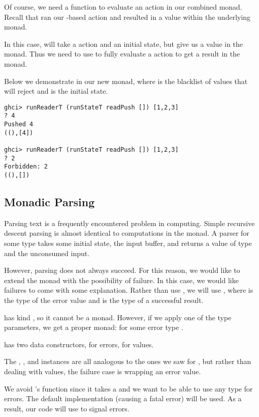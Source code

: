 Of course, we need a function to evaluate an action in our combined  monad.
Recall that  ran our -based action and resulted in a value within
the underlying  monad.

In this case,  will take a  action and an initial state, but
give us a value in the  monad. Thus we need to use  to
fully evaluate a  action to get a result in the  monad.

Below we demonstrate  in our new monad, where \code{[1,2,3]} is the blacklist of values
that  will reject and \code{[]} is the initial state.

\begin{lstlisting}
ghci> runReaderT (runStateT readPush []) [1,2,3]
? 4
Pushed 4
((),[4])

ghci> runReaderT (runStateT readPush []) [1,2,3]
? 2
Forbidden: 2
((),[])
\end{lstlisting}


\subsection{Monadic Parsing}

Parsing text is a frequently encountered problem in computing. Simple recursive descent parsing is almost
identical to computations in the  monad. A parser for some type  takes some initial 
state, the input buffer, and returns a value of type  and the unconsumed input.

However, parsing does not always succeed. For this reason, we would like to extend the  monad
with the possibility of failure. In this case, we would like failures to come with some explanation. Rather
than use , we will use , where  is the type of the error value and
 is the type of a successful result.

 has kind \code{* -> * -> *}, so it cannot be a monad. However, if we apply one of the type
parameters, we get a proper monad:  for some error type .



\begin{notelist}
    \item {} has two data constructors,  for errors,  for values.
    \item The , , and  instances are all analogous to the ones we
          saw for , but rather than dealing with  values, the failure case is  
          wrapping an error value.
    \item We avoid 's  function since it takes a  and we want to be able
          to use any type for errors. The default implementation (causing a fatal error) will be used. As a result,
          our code will use  to signal errors.
\end{notelist}

